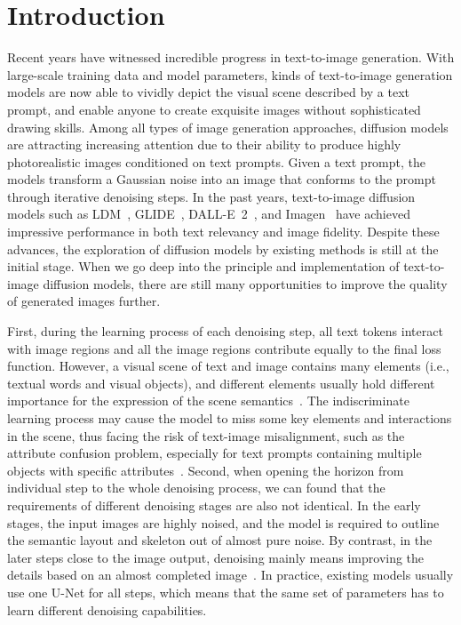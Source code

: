 \documentclass[10pt,twocolumn,letterpaper]{article}
\begin{document}
\section{Introduction}
\label{sec:intro}

Recent years have witnessed incredible progress in text-to-image generation.
With large-scale training data and model parameters, kinds of text-to-image generation models are now able to vividly depict the visual scene described by a text prompt, and enable anyone to create exquisite images without sophisticated drawing skills.
Among all types of image generation approaches, diffusion models~\cite{DBLP:conf/nips/HoJA20} are attracting increasing attention due to their ability to produce highly photorealistic images conditioned on text prompts.
Given a text prompt, the models transform a Gaussian noise into an image that conforms to the prompt through iterative denoising steps.
In the past years, text-to-image diffusion models such as LDM~\cite{DBLP:journals/corr/abs-2112-10752},  GLIDE~\cite{DBLP:conf/icml/NicholDRSMMSC22},  DALL-E~2~\cite{DBLP:journals/corr/abs-2204-06125}, and Imagen~\cite{DBLP:journals/corr/abs-2205-11487} have achieved impressive performance in both text relevancy and image fidelity. 
Despite these advances, the exploration of diffusion models by existing methods is still at the initial stage.
When we go deep into the principle and implementation of text-to-image diffusion models, there are still many opportunities to improve the quality of generated images further.

First, during the learning process of each denoising step, all text tokens interact with image regions and all the image regions contribute equally to the final loss function.
However, a visual scene of text and image contains many elements (i.e., textual words and visual objects), and different elements usually hold different importance for the expression of the scene semantics~\cite{DBLP:conf/aaai/0010TYSTW021}.
The indiscriminate learning process may cause the model to miss some key elements and interactions in the scene, thus facing the risk of text-image misalignment, such as the attribute confusion problem, especially for text prompts containing multiple objects with specific attributes~\cite{DBLP:journals/corr/abs-2204-06125}.
Second, when opening the horizon from individual step to the whole denoising process, we can found that the requirements of different denoising stages are also not identical.
In the early stages, the input images are highly noised, and the model is required to outline the semantic layout and skeleton out of almost pure noise. By contrast, in the later steps close to the image output, denoising mainly means improving the details based on an almost completed image~\cite{DBLP:journals/corr/abs-2112-10752}.
In practice, existing models usually use one U-Net for all steps, which means that the same set of parameters has to learn different denoising capabilities.
\end{document}

